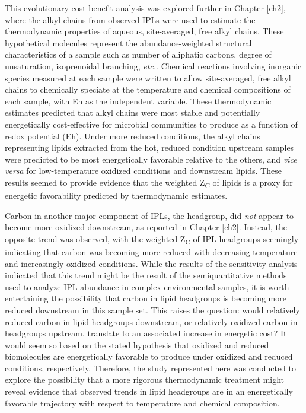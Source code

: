 This evolutionary cost-benefit analysis was explored further in Chapter \ref{ch2}, where the alkyl chains from observed IPLs were used to estimate the thermodynamic properties of aqueous, site-averaged, free alkyl chains. These hypothetical molecules represent the abundance-weighted structural characteristics of a sample such as number of aliphatic carbons, degree of unsaturation, isoprenoidal branching, \textit{etc.}. Chemical reactions involving inorganic species measured at each sample were written to allow site-averaged, free alkyl chains to chemically speciate at the temperature and chemical compositions of each sample, with Eh as the independent variable. These thermodynamic estimates predicted that alkyl chains were most stable and potentially energetically cost-effective for microbial communities to produce as a function of redox potential (Eh). Under more reduced conditions, the alkyl chains representing lipids extracted from the hot, reduced condition upstream samples were predicted to be most energetically favorable relative to the others, and \textit{vice versa} for low-temperature oxidized conditions and downstream lipids. These results seemed to provide evidence that the weighted Z\textsubscript{C} of lipids is a proxy for energetic favorability predicted by thermodynamic estimates.

Carbon in another major component of IPLs, the headgroup, did \textit{not} appear to become more oxidized downstream, as reported in Chapter \ref{ch2}. Instead, the opposite trend was observed, with the weighted Z\textsubscript{C} of IPL headgroups seemingly indicating that carbon was becoming more reduced with decreasing temperature and increasingly oxidized conditions. While the results of the sensitivity analysis indicated that this trend might be the result of the semiquantitative methods used to analyze IPL abundance in complex environmental samples, it is worth entertaining the possibility that carbon in lipid headgroups is becoming more reduced downstream in this sample set. This raises the question: would relatively reduced carbon in lipid headgroups downstream, or relatively oxidized carbon in headgroups upstream, translate to an associated increase in energetic cost? It would seem so based on the stated hypothesis that oxidized and reduced biomolecules are energetically favorable to produce under oxidized and reduced conditions, respectively. Therefore, the study represented here was conducted to explore the possibility that a more rigorous thermodynamic treatment might reveal evidence that observed trends in lipid headgroups are in an energetically favorable trajectory with respect to temperature and chemical composition.


